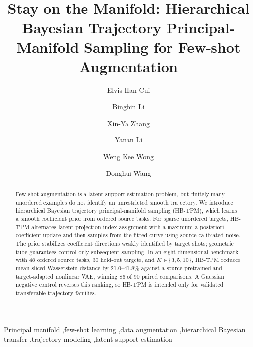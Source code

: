 \documentclass[preprint,12pt,number]{elsarticle}
\begin{document}
\begin{frontmatter}

\title{Stay on the Manifold: Hierarchical Bayesian Trajectory Principal-Manifold Sampling for Few-shot Augmentation}

\author[ucla]{Elvis Han Cui}

\author[zju]{Bingbin Li}

\author[westlake]{Xin-Ya Zhang}

\author[zhejianglab]{Yanan Li}

\author[ucla]{Weng Kee Wong}

\author[zju]{Donghui Wang}






\begin{abstract}
	Few-shot augmentation is a latent support-estimation problem, but finitely many unordered examples do not identify an unrestricted smooth trajectory. We introduce hierarchical Bayesian trajectory principal-manifold sampling (HB-TPM), which learns a smooth coefficient prior from ordered source tasks. For sparse unordered targets, HB-TPM alternates latent projection-index assignment with a maximum-a-posteriori coefficient update and then samples from the fitted curve using source-calibrated noise. The prior stabilizes coefficient directions weakly identified by target shots; geometric tube guarantees control only subsequent sampling. In an eight-dimensional benchmark with 48 ordered source tasks, 30 held-out targets, and $K\in\{3,5,10\}$, HB-TPM reduces mean sliced-Wasserstein distance by 21.0--41.8\% against a source-pretrained and target-adapted nonlinear VAE, winning 86 of 90 paired comparisons. A Gaussian negative control reverses this ranking, so HB-TPM is intended only for validated transferable trajectory families.
\end{abstract}

\begin{keyword}
Principal manifold \sep few-shot learning \sep data augmentation \sep hierarchical Bayesian transfer \sep trajectory modeling \sep latent support estimation
\end{keyword}

\end{frontmatter}
\modulolinenumbers[5]
\linenumbers
\end{document}
